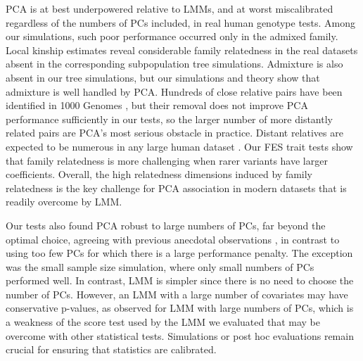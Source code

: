 \documentclass[9pt,lineno]{elife}
\begin{document}
PCA is at best underpowered relative to LMMs, and at worst miscalibrated regardless of the numbers of PCs included, in real human genotype tests.
Among our simulations, such poor performance occurred only in the admixed family.
Local kinship estimates reveal considerable family relatedness in the real datasets absent in the corresponding subpopulation tree simulations.
Admixture is also absent in our tree simulations, but our simulations and theory show that admixture is well handled by PCA.
Hundreds of close relative pairs have been identified in 1000 Genomes \citep{gazal_high_2015, al-khudhair_inference_2015, fedorova_atlas_2016, schlauch_identification_2017}, but their removal does not improve PCA performance sufficiently in our tests, so the larger number of more distantly related pairs are PCA's most serious obstacle in practice.
Distant relatives are expected to be numerous in any large human dataset \citep{henn_cryptic_2012, shchur_number_2018, loh_mixed-model_2018}.
Our FES trait tests show that family relatedness is more challenging when rarer variants have larger coefficients.
Overall, the high relatedness dimensions induced by family relatedness is the key challenge for PCA association in modern datasets that is readily overcome by LMM.

Our tests also found PCA robust to large numbers of PCs, far beyond the optimal choice, agreeing with previous anecdotal observations \citep{price_principal_2006, kang_variance_2010}, in contrast to using too few PCs for which there is a large performance penalty.
The exception was the small sample size simulation, where only small numbers of PCs performed well.
In contrast, LMM is simpler since there is no need to choose the number of PCs.
However, an LMM with a large number of covariates may have conservative p-values, as observed for LMM with large numbers of PCs, which is a weakness of the score test used by the LMM we evaluated that may be overcome with other statistical tests.
Simulations or post hoc evaluations remain crucial for ensuring that statistics are calibrated.
\end{document}
